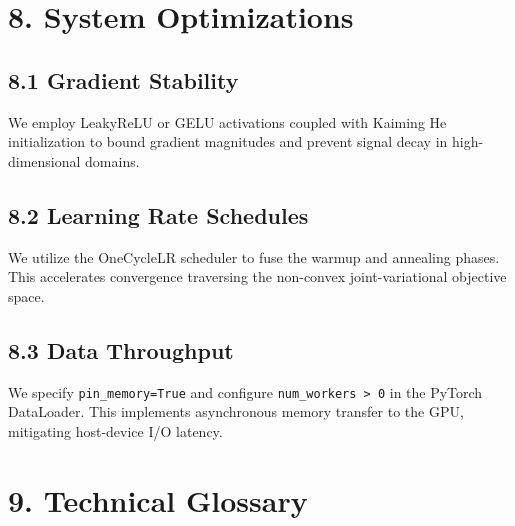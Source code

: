 \documentclass[
  letterpaper,
]{report}
\begin{document}
\section{8. System Optimizations}\label{system-optimizations}

\subsection{8.1 Gradient Stability}\label{gradient-stability}

We employ LeakyReLU or GELU activations coupled with Kaiming He
initialization to bound gradient magnitudes and prevent signal decay in
high-dimensional domains.

\subsection{8.2 Learning Rate Schedules}\label{learning-rate-schedules}

We utilize the OneCycleLR scheduler to fuse the warmup and annealing
phases. This accelerates convergence traversing the non-convex
joint-variational objective space.

\subsection{8.3 Data Throughput}\label{data-throughput}

We specify \texttt{pin\_memory=True} and configure
\texttt{num\_workers\ \textgreater{}\ 0} in the PyTorch DataLoader. This
implements asynchronous memory transfer to the GPU, mitigating
host-device I/O latency.

\section{9. Technical Glossary}\label{technical-glossary}
\end{document}
